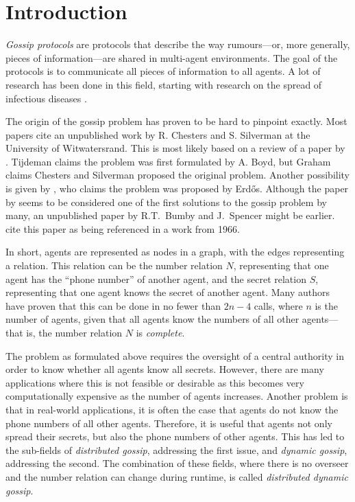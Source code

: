 
\section{Introduction}
\label{sec:introduction}

\textit{Gossip protocols} are protocols that describe the way rumours---or, more generally, pieces of information---are shared in multi-agent environments.
The goal of the protocols is to communicate all pieces of information to all agents.
A lot of research has been done in this field, 
starting with research on the spread of infectious diseases \parencite{kermack_contribution_1927}.

The origin of the gossip problem has proven to be hard to pinpoint exactly.
Most papers cite an unpublished work by R. Chesters and S. Silverman at the University of Witwatersrand.
This is most likely based on a review \parencite{graham_review_1972} of a paper by \textcite{tijdeman_telephone_1971}.
Tijdeman claims the problem was first formulated by A. Boyd, but Graham claims Chesters and Silverman proposed the original problem.
Another possibility is given by \textcite{lebensold_efficient_1973}, who claims the problem was proposed by Erd\H{o}s.
Although the paper by \citeauthor{tijdeman_telephone_1971} seems to be considered one of the first solutions to the gossip problem by many,
an unpublished paper by R.T.~Bumby and J.~Spencer might be earlier. 
\textcite{harary_communication_1974} cite this paper as being referenced in a work from 1966.

In short, agents are represented as nodes in a graph, with the edges representing a relation.
This relation can be the number relation \(N\), representing that one agent has the ``phone number'' of another agent,
and the secret relation \(S\), representing that one agent knows the secret of another agent.
Many authors \parencite[e.g.,][]{tijdeman_telephone_1971, hajnal_cure_1972, baker_gossips_1972, lebensold_efficient_1973} have proven that this can be done in no fewer than \(2n-4\) calls,
where \(n\) is the number of agents,
given that all agents know the numbers of all other agents---that is, the number relation \(N\) is \textit{complete}.

The problem as formulated above requires the oversight of a central authority in order to know whether all agents know all secrets.
However, there are many applications where this is not feasible or desirable as this becomes very computationally expensive as the number of agents increases.
Another problem is that in real-world applications, it is often the case that agents do not know the phone numbers of all other agents. Therefore, it is useful that agents not only spread their secrets, but also the phone numbers of other agents.
This has led to the sub-fields of \textit{distributed gossip}, addressing the first issue, and \textit{dynamic gossip}, addressing the second.
The combination of these fields, where there is no overseer and the number relation can change during runtime, is called \textit{distributed dynamic gossip}.

